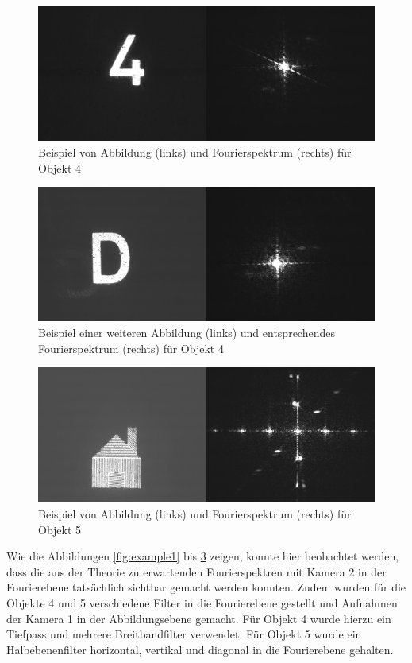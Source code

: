 \begin{figure}
	\centering
	\includegraphics[width=0.7\linewidth]{images/example4.png}
	\caption{Beispiel von Abbildung (links) und Fourierspektrum (rechts) für Objekt 4}
	\label{fig:example4}
\end{figure}

\begin{figure}
	\centering
	\includegraphics[width=0.7\linewidth]{images/example9.png}
	\caption{Beispiel einer weiteren Abbildung (links) und entsprechendes Fourierspektrum (rechts) für Objekt 4}
	\label{fig:example9}
\end{figure}

\begin{figure}
	\centering
	\includegraphics[width=0.7\linewidth]{images/example16.png}
	\caption{Beispiel von Abbildung (links) und Fourierspektrum (rechts) für Objekt 5}
	\label{fig:example16}
\end{figure}


Wie die Abbildungen \ref{fig:example1} bis \ref{fig:example16} zeigen, konnte hier beobachtet werden, dass die aus der Theorie zu erwartenden Fourierspektren mit Kamera 2 in der Fourierebene tatsächlich sichtbar gemacht werden konnten. 
Zudem wurden für die Objekte 4 und 5 verschiedene Filter in die Fourierebene gestellt und Aufnahmen der Kamera 1 in der Abbildungsebene gemacht. Für Objekt 4 wurde hierzu ein Tiefpass und mehrere Breitbandfilter verwendet. Für Objekt 5 wurde ein Halbebenenfilter horizontal, vertikal und diagonal in die Fourierebene gehalten. \\

